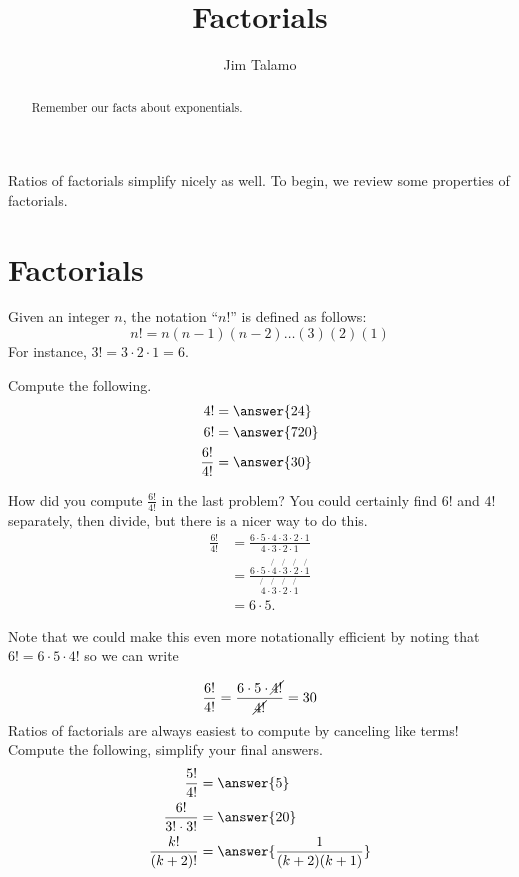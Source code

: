 \documentclass{ximera}
\title[Refresh:]{Factorials}
\author{Jim Talamo}
\begin{document}
\begin{abstract}
  Remember our facts about exponentials.
\end{abstract}
\maketitle


\begin{exercise}
Ratios of factorials simplify nicely as well.  To begin, we review some properties of factorials.

\section{Factorials}

\begin{problem}
  Given an integer $n$, the notation ``$n!$'' is defined as follows:
  \[
  n! = n(n-1)(n-2)\dots (3)(2)(1)
  \]
  For instance, $3!=3\cdot2\cdot 1 = 6$. 
  
Compute the following.
  \begin{align*}
    4! &= \answer{24}\\
    6! &= \answer{720}\\
    \frac{6!}{4!} &= \answer{30}
  \end{align*}
  
  \begin{problem}
    How did you compute $\frac{6!}{4!}$ in the last problem? You could
    certainly find $6!$ and $4!$ separately, then divide, but there is
    a nicer way to do this.
    \begin{align*}
      \frac{6!}{4!} &= \frac{6\cdot5\cdot4\cdot3\cdot2\cdot1}{4\cdot3\cdot2\cdot1}\\
      &=\frac{6\cdot5\cdot\not{4}\cdot\not{3}\cdot\not{2}\cdot\not{1}}{\not{4}\cdot\not{3}\cdot\not{2}\cdot\not{1}}\\
      &= 6\cdot 5.
    \end{align*}
    
    Note that we could make this even more notationally efficient by noting that $6! = 6 \cdot 5 \cdot 4!$ so we can write
    
    \[
    \frac{6!}{4!} = \frac{6 \cdot 5 \cdot \cancel{4!}}{\cancel{4!}} =30
    \]
    Ratios of factorials are always easiest to compute by canceling
    like terms! Compute the following, simplify your final answers.
    \begin{align*}
      \frac{5!}{4!} &= \answer{5}\\
      \frac{6!}{3!\cdot 3!} &= \answer{20}\\
      \frac{k!}{(k+2)!}  &=\answer{\frac{1}{(k+2)(k+1)}}
    \end{align*}
    

\end{problem}
\end{problem}
\end{exercise}
\end{document}
